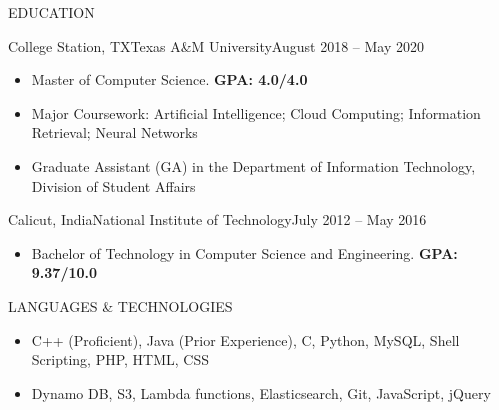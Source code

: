 \documentclass[]{mcdowellcv}
\begin{document}
	\makeheader
	
	\begin{cvsection}{EDUCATION}
		\begin{cvsubsection}{College Station, TX}{Texas A\&M University}{August 2018 -- May 2020}
			\begin{itemize}
				\item Master of Computer Science. \textbf{GPA: 4.0/4.0}
				\item Major Coursework: Artificial Intelligence; Cloud Computing; Information Retrieval; Neural Networks
				\item Graduate Assistant (GA) in the Department of Information Technology, Division of Student Affairs
			\end{itemize}
		\end{cvsubsection}
		
		\begin{cvsubsection}{Calicut, India}{National Institute of Technology}{July 2012 -- May 2016}
			\begin{itemize}
				\item Bachelor of Technology in Computer Science and Engineering. \textbf{GPA: 9.37/10.0}
			\end{itemize}
		\end{cvsubsection}
	\end{cvsection}
	
	\begin{cvsection}{LANGUAGES \& TECHNOLOGIES}
		\begin{cvsubsection}{}{}{}	
			\begin{itemize}
				\item C++ (Proficient), Java (Prior Experience), C, Python, MySQL, Shell Scripting, PHP, HTML, CSS 
				\item Dynamo DB, S3, Lambda functions, Elasticsearch, Git, JavaScript, jQuery
			\end{itemize}
		\end{cvsubsection}
	\end{cvsection}
	
\end{document}
